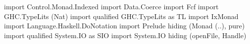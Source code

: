 \begin{code}
import Control.Monad.Indexed
import Data.Coerce
import Fcf
import GHC.TypeLits (Nat)
import qualified GHC.TypeLits as TL
import IxMonad
import Language.Haskell.DoNotation
import Prelude hiding (Monad (..), pure)
import qualified System.IO as SIO
import System.IO hiding (openFile, Handle)
\end{code}
